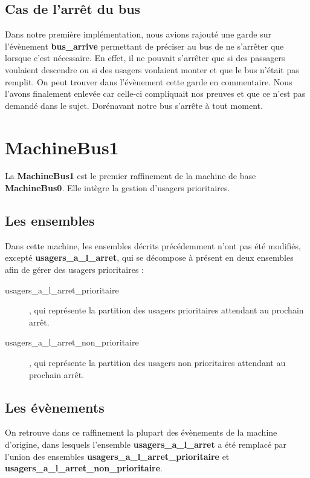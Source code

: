 \documentclass[a4paper,titlepage]{report}
\begin{document}
	\subsection{Cas de l'arrêt du bus}
		Dans notre première implémentation, nous avions rajouté une garde sur l'évènement \textbf{bus\_arrive} permettant de préciser au bus de ne s'arrêter que lorsque c'est nécessaire. En effet, il ne pouvait s'arrêter que si des passagers voulaient descendre ou si des usagers voulaient monter et que le bus n'était pas remplit. On peut trouver dans l'évènement cette garde en commentaire. Nous l'avons finalement enlevée car celle-ci compliquait nos preuves et que ce n'est pas demandé dans le sujet. Dorénavant notre bus s'arrête à tout moment.
	
\section{MachineBus1}
	La \textbf{MachineBus1} est le premier raffinement de la machine de base \textbf{MachineBus0}. Elle intègre la gestion d'usagers prioritaires.\\
		
	\subsection{Les ensembles}
		Dans cette machine, les ensembles décrits précédemment n'ont pas été modifiés, excepté \textbf{usagers\_a\_l\_arret}, qui se décompose à présent en deux ensembles afin de gérer des usagers prioritaires :
		 	
		\begin{description}
			\item[usagers\_a\_l\_arret\_prioritaire], qui représente la partition des usagers prioritaires attendant au prochain arrêt.
			\item[usagers\_a\_l\_arret\_non\_prioritaire], qui représente la partition des usagers non prioritaires attendant au prochain arrêt.\\
		\end{description}
				
	\subsection{Les évènements}
		On retrouve dans ce raffinement la plupart des évènements de la machine d'origine, dans lesquels l'ensemble \textbf{usagers\_a\_l\_arret} a été remplacé par l'union des ensembles \textbf{usagers\_a\_l\_arret\_prioritaire} et \textbf{usagers\_a\_l\_arret\_non\_prioritaire}.\\
		
\end{document}
